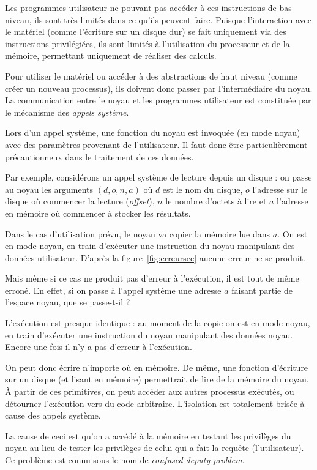 Les programmes utilisateur ne pouvant pas accéder à ces instructions de bas
niveau, ils sont très limités dans ce qu'ils peuvent faire. Puisque
l'interaction avec le matériel (comme l'écriture sur un disque dur) se fait
uniquement via des instructions privilégiées, ils sont limités à l'utilisation
du processeur et de la mémoire, permettant uniquement de réaliser des calculs.

Pour utiliser le matériel ou accéder à des abstractions de haut niveau (comme
créer un nouveau processus), ils doivent donc passer par l'intermédiaire du
noyau. La communication entre le noyau et les programmes utilisateur est
constituée par le mécanisme des \emph{appels système}.

Lors d'un appel système, une fonction du noyau est invoquée (en mode noyau) avec
des paramètres provenant de l'utilisateur. Il faut donc être particulièrement
précautionneux dans le traitement de ces données.

Par exemple, considérons un appel système de lecture depuis un disque : on passe
au noyau les arguments $(d, o, n, a)$ où $d$ est le nom du disque, $o$ l'adresse
sur le disque où commencer la lecture (\emph{offset}), $n$ le nombre d'octets à
lire et $a$ l'adresse en mémoire où commencer à stocker les résultats.

Dans le cas d'utilisation prévu, le noyau va copier la mémoire lue dans $a$. On
est en mode noyau, en train d'exécuter une instruction du noyau manipulant des
données utilisateur. D'après la figure~\ref{fig:erreursec} aucune erreur ne se
produit.

Mais même si ce cas ne produit pas d'erreur à l'exécution, il est tout de même
erroné. En effet, si on passe à l'appel système une adresse $a$ faisant partie
de l'espace noyau, que se passe-t-il ?

L'exécution est presque identique : au moment de la copie on est en mode noyau,
en train d'exécuter une instruction du noyau manipulant des données noyau.
Encore une fois il n'y a pas d'erreur à l'exécution.

On peut donc écrire n'importe où en mémoire. De même, une fonction d'écriture
sur un disque (et lisant en mémoire) permettrait de lire de la mémoire du noyau.
À partir de ces primitives, on peut accéder aux autres processus exécutés, ou
détourner l'exécution vers du code arbitraire. L'isolation est totalement
brisée à cause des appels système.

La cause de ceci est qu'on a accédé à la mémoire en testant les privilèges du
noyau au lieu de tester les privilèges de celui qui a fait la requête
(l'utilisateur). Ce problème est connu sous le nom de \emph{confused deputy
problem}\cite{hardy88confused}.

